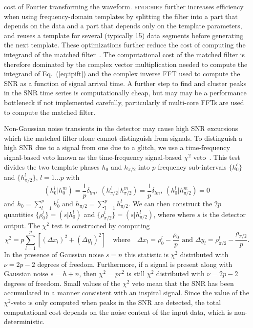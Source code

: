 cost of Fourier transforming the waveform.  \textsc{findchirp} further
increases efficiency when using frequency-domain templates by splitting the
filter into a part that depends on the data and a part that depends only on
the template parameters, and reuses a template for several (typically 15) data
segments before generating the next template.  These optimizations further
reduce the cost of computing the integrand of the matched filter~\cite{Allen:2005fk}. 
The computational cost of the matched filter is therefore dominated by the
complex vector multiplication needed to compute the integrand of Eq.~(\ref{eq:ipift}) and the complex inverse FFT used to compute the SNR as a function of signal arrival time. A further step to find and cluster peaks in the SNR time series is computationally cheap, but may may be a performance bottleneck if not implemented carefully, particularly if multi-core FFTs are used to compute the matched filter.

Non-Gaussian noise transients in the detector may cause
high SNR excursions which the matched filter alone cannot distinguish from
signals. To distinguish a high \ac{SNR} due to a
signal from one due to a glitch, we use a time-frequency signal-based veto known as the time-frequency signal-based
$\chi^2$ veto~\cite{Allen:2004}. This test divides 
the two template phases $h_0$ and $h_{\pi/2}$ 
into $p$ frequency sub-intervals $\{h_0^l\}$ and $\{h_{\pi/2}^l\}$, $l=1\ldots p$ with
\begin{equation}
  (h_0^l|h_0^m) = \frac{1}{p}\delta_{lm}, \ 
  (h_{\pi/2}^l|h_{\pi/2}^m) = \frac{1}{p}\delta_{lm}, \ 
  (h_0^l|h_{\pi/2}^m) = 0
\end{equation}
and $h_0=\sum_{l=1}^p h_0^l$ and $h_{\pi/2}=\sum_{l=1}^p h_{\pi/2}^l$. We can
then construct the $2p$ quantities $\{\rho_0^l\}  =(s|h_0^l)$ and $\{\rho_{\pi/2}^l\} = (s|h_{\pi/2}^l)$, where 
where $s$ is the detector output. The $\chi^2$ test is constructed by
computing
\begin{equation}
\chi^2 = p \sum_{l=1}^p \left[ (\Delta x_l)^2 + (\Delta y_l)^2 \right]
\quad\textrm{where}\quad
\Delta x_l = \rho^l_0 - \frac{\rho_0}{p} \textrm{ and }
\Delta y_l = \rho_{\pi/2}^l - \frac{\rho_{\pi/2}}{p}.
\end{equation}
In the presence of Gaussian noise $s=n$ this statistic is $\chi^2$ distributed
with $\nu=2p-2$ degrees of freedom.  Furthermore, if a signal is present along with
Gaussian noise $s=h+n$, then $\chi^2=pr^2$ is still $\chi^2$ distributed
with $\nu=2p-2$ degrees of freedom. Small values of the $\chi^2$ veto mean
that the \ac{SNR} has been accumulated in a manner consistent
with an inspiral signal. Since the value of the $\chi^2$-veto is only computed
when peaks in the \ac{SNR} are detected, the total computational cost depends
on the noise content of the input data, which is non-deterministic. 


